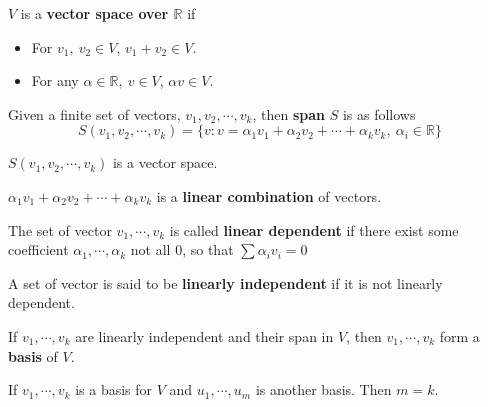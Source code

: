 \begin{definition}
	$V$ is a \textbf{vector space over $\mathbb{R}$} if
	\begin{itemize}
		\item For $v_1, ~v_2 \in V$, $v_1 + v_2 \in V$.
		\item For any $\alpha \in \mathbb{R}, ~v \in V$, $\alpha v \in V$.
	\end{itemize}
\end{definition}

\begin{definition}
    Given a finite set of vectors, $v_1, v_2, \cdots, v_k$, then \textbf{span} 
$S$ is as 
    follows
    \[S(v_1, v_2, \cdots, v_k) = \{v: v = \alpha_1 v_1 + \alpha_2 v_2 + \cdots 
    +\alpha_k v_k, ~\alpha_i \in \mathbb{R}\}\]
\end{definition}
$S(v_1, v_2, \cdots, v_k)$ is a vector space.

\begin{definition}
	$\alpha_1 v_1 + \alpha_2 v_2 + \cdots +\alpha_k v_k$ is a \textbf{linear 
combination} of vectors. 
\end{definition}

\begin{definition}
    The set of vector $v_1, \cdots, v_k$ is called \textbf{linear dependent} if 
there exist some coefficient $\alpha_1, \cdots, \alpha_k$ not all $0$, so that 
$\sum \alpha_i v_i = 0$
\end{definition}

\begin{definition}
	A set of vector is said to be \textbf{linearly independent} if it is not 
linearly dependent.
\end{definition}

\begin{definition}
	If $v_1, \cdots, v_k$ are linearly independent and their span in $V$, then 
$v_1, \cdots, v_k$ form a \textbf{basis} of $V$.
\end{definition}

\begin{definition}
	If $v_1, \cdots, v_k$ is a basis for $V$ and $u_1, \cdots, u_m$ is another 
basis. Then $m = k$.
\end{definition}


